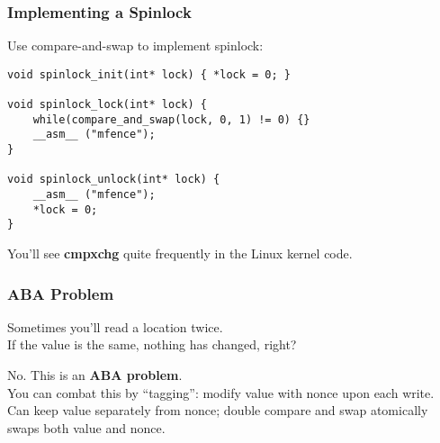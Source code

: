 \begin{frame}[fragile]
  \frametitle{Implementing a Spinlock}

  
  Use compare-and-swap to implement spinlock:
  \begin{lstlisting}
void spinlock_init(int* lock) { *lock = 0; }

void spinlock_lock(int* lock) {
    while(compare_and_swap(lock, 0, 1) != 0) {}
    __asm__ ("mfence");
}

void spinlock_unlock(int* lock) {
    __asm__ ("mfence");
    *lock = 0;  
}
  \end{lstlisting}
  You'll see {\bf cmpxchg} quite frequently in the Linux kernel code.
  
\end{frame}

\begin{frame}[fragile]
  \frametitle{ABA Problem}

  
    Sometimes you'll read a location twice.\\[1em]

    If the value is the same, nothing has changed, right?

    \pause

    \alert{No.} This is an {\bf ABA problem}.\\[1em]

    You can combat this by ``tagging'': modify value with nonce upon each write.\\[1em]

    Can keep value separately from nonce; double compare and swap atomically swaps both value and nonce.\\[2em]


  
\end{frame}

